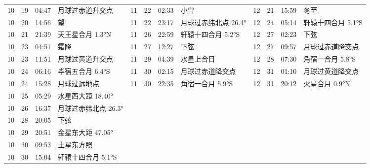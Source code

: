 \begin{tabular}{llll|llll|llll}
10 & 19 & 04:47 & 月球过赤道升交点 & 11 & 22 & 02:33 & 小雪 & 12 & 21 & 15:59 & 冬至 \tabularnewline
10 & 20 & 14:56 & 望 & 11 & 22 & 23:17 & 月球过赤纬北点 26.4° & 12 & 24 & 05:14 & 轩辕十四合月 5.1°S \tabularnewline
10 & 21 & 21:39 & 天王星合月 1.3°N & 11 & 26 & 22:59 & 轩辕十四合月 5.2°S & 12 & 27 & 02:23 & 下弦 \tabularnewline
10 & 23 & 04:51 & 霜降 & 11 & 27 & 12:27 & 下弦 & 12 & 27 & 09:57 & 月球过赤道降交点 \tabularnewline
10 & 23 & 11:51 & 月球过黄道升交点 & 11 & 29 & 04:39 & 水星上合日 & 12 & 28 & 07:30 & 角宿一合月 5.8°S \tabularnewline
10 & 24 & 06:16 & 毕宿五合月 6.4°S & 11 & 30 & 02:15 & 月球过赤道降交点 & 12 & 31 & 01:10 & 月球过黄道降交点 \tabularnewline
10 & 24 & 15:28 & 月球过远地点 & 11 & 30 & 22:35 & 角宿一合月 5.9°S & 12 & 31 & 20:12 & 火星合月 0.9°N \tabularnewline
10 & 25 & 05:29 & 水星西大距 18.40° &  &  &  &  &  &  &  &  \tabularnewline
10 & 26 & 16:37 & 月球过赤纬北点 26.3° &  &  &  &  &  &  &  &  \tabularnewline
10 & 28 & 20:05 & 下弦 &  &  &  &  &  &  &  &  \tabularnewline
10 & 29 & 20:51 & 金星东大距 47.05° &  &  &  &  &  &  &  &  \tabularnewline
10 & 30 & 09:53 & 土星东方照 &  &  &  &  &  &  &  &  \tabularnewline
10 & 30 & 15:04 & 轩辕十四合月 5.1°S &  &  &  &  &  &  &  &  \tabularnewline
\hline \end{tabular}
